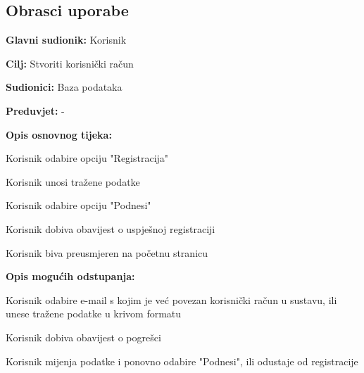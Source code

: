 			\eject 
			
			
				
			\subsection{Obrasci uporabe}
					
					\noindent {}
					\begin{packed_item}
	
						\item \textbf{Glavni sudionik: }Korisnik
						\item  \textbf{Cilj:} Stvoriti korisnički račun
						\item  \textbf{Sudionici:} Baza podataka
						\item  \textbf{Preduvjet:} -
						\item  \textbf{Opis osnovnog tijeka:}
						
						\item[] \begin{packed_enum}
	
							\item Korisnik odabire opciju "Registracija"
							\item Korisnik unosi tražene podatke
							\item Korisnik odabire opciju "Podnesi"
							\item Korisnik dobiva obavijest o uspješnoj registraciji
							\item Korisnik biva preusmjeren na početnu stranicu
						\end{packed_enum}
						
						\item  \textbf{Opis mogućih odstupanja:}
						
						\item[] \begin{packed_item}
	
							\item[3.a] Korisnik odabire e-mail s kojim je već povezan korisnički račun u sustavu, ili unese tražene podatke u krivom formatu
							\item[] \begin{packed_enum}
								
								\item Korisnik dobiva obavijest o pogrešci
								\item Korisnik mijenja podatke i ponovno odabire "Podnesi", ili odustaje od registracije
								
							\end{packed_enum}
							
						\end{packed_item}
					\end{packed_item}
					
